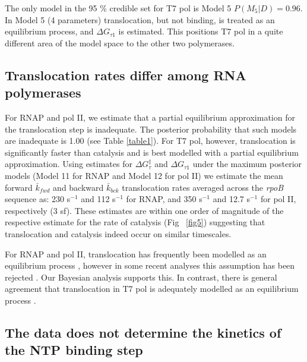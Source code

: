\documentclass[10pt,letterpaper]{article}
\begin{document}
The only model in the 95 \% credible set for T7 pol is Model 5 $P(M_{5}|D) = 0.96$. In Model 5 (4 parameters) translocation, but not binding, is treated as an equilibrium process, and $\Delta G_{\tau 1}$ is estimated. This positions T7 pol in a quite different area of the model space to the other two polymerases. \par










\subsection*{Translocation rates differ among RNA polymerases} For RNAP and pol II, we estimate that a partial equilibrium approximation for the translocation step is inadequate. The posterior probability that such models are inadequate is 1.00 (see Table \ref{table1}). For T7 pol, however, translocation is significantly faster than catalysis and is best modelled with a partial equilibrium approximation. Using estimates for $\Delta G_\tau^\ddag$ and $\Delta G_{\tau 1}$ under the maximum posterior models (Model 11 for RNAP and Model 12 for pol II) we estimate the mean forward $\bar{k}_{fwd}$ and backward $\bar{k}_{bck}$ translocation rates averaged across the \textit{ rpoB} sequence as:  230 s$^{-1}$ and 112 s$^{-1}$ for RNAP, and 350 s$^{-1}$ and 12.7 s$^{-1}$ for pol II, respectively (3 sf). These estimates are within one order of magnitude of the respective estimate for the rate of catalysis (Fig ~\ref{fig5}) suggesting that translocation and catalysis indeed occur on similar timescales.  \par

For RNAP and pol II, translocation has frequently been modelled as an equilibrium process \cite{abbondanzieri2005direct, bai2004sequence, mejia2015trigger, larson2012trigger, schweikhard2014transcription}, however in some recent analyses this assumption has been rejected \cite{tadigotla2006thermodynamic, maoileidigh2011unified, nedialkov2012rna, Dangkulwanich2013complete, kireeva2018rna}. Our Bayesian analysis supports this. In contrast, there is general agreement that translocation in T7 pol is adequately modelled as an equilibrium process \cite{guajardo1998ntp, arnold2001kinetic, thomen2008t7}. \par





\subsection*{The data does not determine the kinetics of the NTP binding step}
\end{document}
